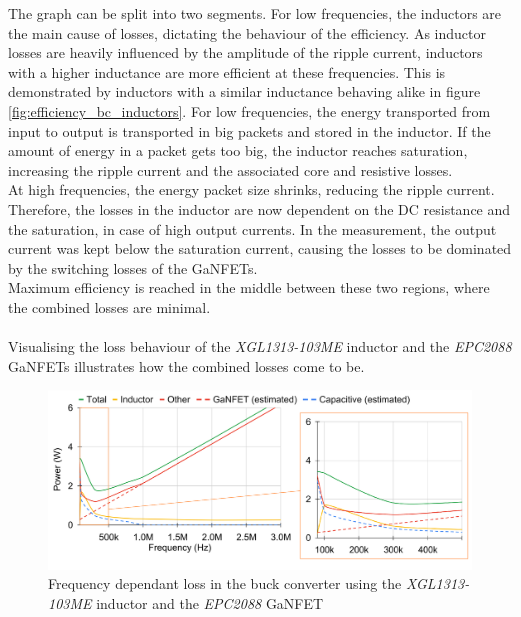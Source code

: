 The graph can be split into two segments. For low frequencies, the inductors are the main cause of losses, dictating the behaviour of the efficiency. As inductor losses are heavily influenced by the amplitude of the ripple current, inductors with a higher inductance are more efficient at these frequencies. This is demonstrated by inductors with a similar inductance behaving alike in figure \ref{fig:efficiency_bc_inductors}. For low frequencies, the energy transported from input to output is transported in big packets and stored in the inductor. If the amount of energy in a packet gets too big, the inductor reaches saturation, increasing the ripple current and the associated core and resistive losses.\\
At high frequencies, the energy packet size shrinks, reducing the ripple current. Therefore, the losses in the inductor are now dependent on the \ac{DC} resistance and the saturation, in case of high output currents. In the measurement, the output current was kept below the saturation current, causing the losses to be dominated by the switching losses of the \acp{GaNFET}.\\
Maximum efficiency is reached in the middle between these two regions, where the combined losses are minimal.\\\\
Visualising the loss behaviour of the \textit{XGL1313-103ME} inductor and the \textit{EPC2088} \acp{GaNFET} illustrates how the combined losses come to be. 
\begin{figure}[h]
        \includegraphics[width=1\textwidth]{Bilder/Kapitel4/BC_Meas_Losses_in_XGL103.png}
        \caption{Frequency dependant loss in the buck converter using the \textit{XGL1313-103ME} inductor and the \textit{EPC2088} \ac{GaNFET}}
        \label{fig:bc_losses_measured}							
\end{figure}
